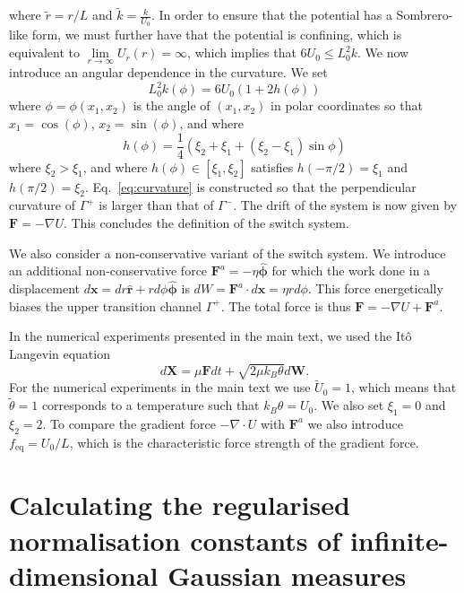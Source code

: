 \documentclass[]{cam-thesis}
\begin{document}
where $\tilde{r} = r / L$ and $\tilde{k} = \frac{k}{U_0}$. In order to ensure that the potential has a Sombrero-like form, we
must further have that the potential is confining, which is equivalent
to $\underset{r\to\infty}{\lim}U_{r}(r)=\infty$, which implies that
$6U_{0}\leq L_0^{2}k$. We now introduce an angular dependence in the
curvature. We set
\begin{equation}
L_0^{2}k(\phi)=6U_{0}(1+2h(\phi))\label{eq:curvature}
\end{equation}
where $\phi=\phi(x_{1},x_{2})$ is the angle of $(x_{1},x_{2})$ in
polar coordinates so that $x_{1}=\cos(\phi)$, $x_{2}=\sin(\phi)$,
and where
\begin{equation}
h(\phi)=\frac{1}{4}\left(\xi_{2}+\xi_{1}+(\xi_{2}-\xi_{1})\sin\phi\right)
\end{equation}
where $\xi_{2}>\xi_{1}$, and where $h(\phi)\in[\xi_{1},\xi_{2}]$
satisfies $h(-\pi/2)=\xi_{1}$ and $h(\pi/2)=\xi_{2}$. Eq.~\eqref{eq:curvature}
is constructed so that the perpendicular curvature of $\Gamma^{+}$
is larger than that of $\Gamma^{-}$. The drift of the system is now
given by $\mathbf{F}=-\nabla U$. This concludes the definition of the switch system.

We also consider a non-conservative variant of the switch system. We introduce an additional non-conservative
force $\mathbf{F}^{a}=-\eta\hat{\boldsymbol{\phi}}$ for which the
work done in a displacement $d\mathbf{x}=dr\hat{\mathbf{r}}+rd\phi\hat{\boldsymbol{\phi}}$
is $dW=\mathbf{F}^{a}\cdot d\mathbf{x}=\eta rd\phi$. This force energetically
biases the upper transition channel $\Gamma^{+}$. The total force
is thus $\mathbf{F}=-\nabla U+\mathbf{F}^{a}$.

In the numerical experiments presented in the main text, we used the
Itô Langevin equation 
\begin{equation}
d\mathbf{X}=\mu\mathbf{F}dt+\sqrt{2\mu k_{B}\theta}d\mathbf{W}.\label{eq:langevin equation}
\end{equation}
For the numerical experiments in the main text  we use $\tilde{U}_{0}=1$,
which means that $\tilde{\theta}=1$ corresponds to a temperature
such that $k_{B}\theta=U_{0}$. We also set $\xi_{1}=0$ and $\xi_{2}=2$.
To compare the gradient force $-\nabla \cdot U$ with $\mathbf{F}^{a}$ we also introduce
$f_{\text{eq}}=U_{0}/L$, which is the characteristic force strength
of the gradient force.

\chapter{Calculating the regularised normalisation constants of infinite-dimensional Gaussian measures} \label{app:Calculation of the Gaussian normalisation constants}
\end{document}
